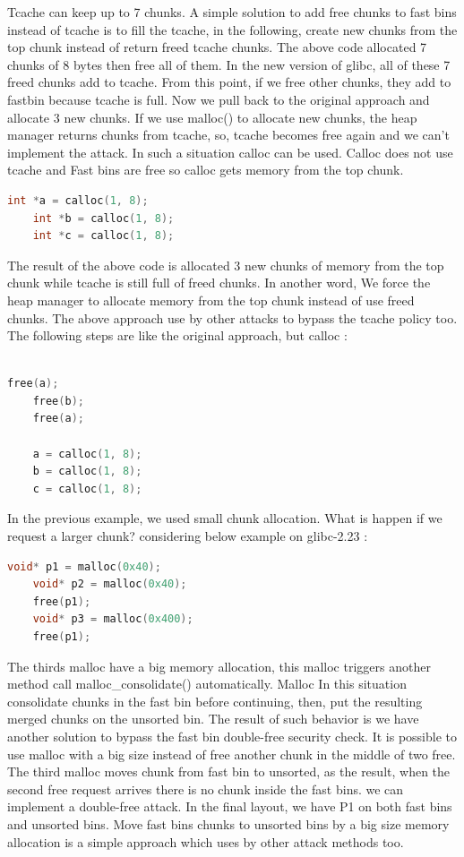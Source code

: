 \documentclass{masterthesis}
\newcommand*\libc{glibc}
\begin{document}
Tcache can keep up to 7 chunks. A simple solution to add free chunks to fast bins instead of tcache is to fill the tcache, in the following, create new chunks from the top chunk instead of return freed tcache chunks. The above code allocated 7 chunks of 8 bytes then free all of them. In the new version of \libc{}, all of these 7 freed chunks add to tcache. From this point, if we free other chunks, they add to fastbin because tcache is full. Now we pull back to the original approach and allocate 3 new chunks. If we use malloc() to allocate new chunks, the heap manager returns chunks from tcache, so, tcache becomes free again and we can’t implement the attack. In such a situation calloc can be used. Calloc does not use tcache and Fast bins are free so calloc gets memory from the top chunk. 

\begin{lstlisting}[language=c,frame=tlrb]
	int *a = calloc(1, 8);
	int *b = calloc(1, 8);
	int *c = calloc(1, 8);
\end{lstlisting}

The result of the above code is allocated 3 new chunks of memory from the top chunk while tcache is still full of freed chunks. In another word, We force the heap manager to allocate memory from the top chunk instead of use freed chunks. The above approach use by other attacks to bypass the tcache policy too. The following steps are like the original approach, but calloc :

\begin{lstlisting}[language=c,frame=tlrb]

free(a);
	free(b);
	free(a);

	a = calloc(1, 8);
	b = calloc(1, 8);
	c = calloc(1, 8);
\end{lstlisting}

In the previous example, we used small chunk allocation. What is happen if we request a larger chunk? considering below example on \libc{-2.23} :

\begin{lstlisting}[language=c,frame=tlrb]
 	void* p1 = malloc(0x40);
	void* p2 = malloc(0x40);
 	free(p1);
	void* p3 = malloc(0x400);
	free(p1);
\end{lstlisting}

The thirds malloc have a big memory allocation, this malloc triggers another method call malloc\_consolidate() automatically. Malloc In this situation consolidate chunks in the fast bin before continuing, then, put the resulting merged chunks on the unsorted bin.
The result of such behavior is we have another solution to bypass the fast bin double-free security check. It is possible to use malloc with a big size instead of free another chunk in the middle of two free. The third malloc moves chunk from fast bin to unsorted, as the result, when the second free request arrives there is no chunk inside the fast bins. we can implement a double-free attack. In the final layout, we have P1 on both fast bins and unsorted bins. Move fast bins chunks to unsorted bins by a big size memory allocation is a simple approach which uses by other attack methods too.
\end{document}
